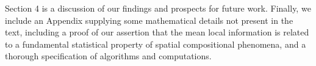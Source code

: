 	Section 4 is a discussion of our findings and prospects for future work. Finally, we include an Appendix supplying some mathematical details not present in the text, including a proof of our assertion that the mean local information is related to a fundamental statistical property of spatial compositional phenomena, and a thorough specification of algorithms and computations. 


